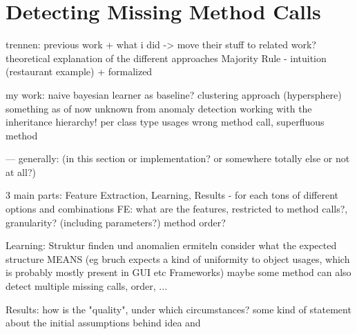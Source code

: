 \chapter{Detecting Missing Method Calls}

 trennen: previous work + what i did -> move their stuff to related work?
	theoretical explanation of the different approaches
	Majority Rule - intuition (restaurant example) + formalized 

my work:
    naive bayesian learner as baseline?
    clustering approach (hypersphere)
    something as of now unknown from anomaly detection
    working with the inheritance hierarchy!
    per class type usages
    wrong method call, superfluous method

--- generally: (in this section or implementation? or somewhere totally else or not at all?)

3 main parts: Feature Extraction, Learning, Results -	for each tons of different options and combinations
FE:
    what are the features, restricted to method calls?, granularity? (including parameters?)
    method order?

Learning:
    Struktur finden und anomalien ermiteln	
    consider what the expected structure MEANS (eg bruch expects a kind of uniformity to object usages, which is probably mostly present in GUI etc Frameworks)
    maybe some method can also detect multiple missing calls, order, ...

Results:
	how is the "quality", under which circumstances?
	some kind of statement about the initial assumptions behind idea and 

